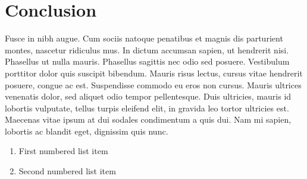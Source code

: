 \documentclass[a4paper, 12pt]{article} %
\begin{document}

\section*{Conclusion}

Fusce in nibh augue. Cum sociis natoque penatibus et magnis dis parturient montes, nascetur ridiculus mus. In dictum accumsan sapien, ut hendrerit nisi. Phasellus ut nulla mauris. Phasellus sagittis nec odio sed posuere. Vestibulum porttitor dolor quis suscipit bibendum. Mauris risus lectus, cursus vitae hendrerit posuere, congue ac est. Suspendisse commodo eu eros non cursus. Mauris ultrices venenatis dolor, sed aliquet odio tempor pellentesque. Duis ultricies, mauris id lobortis vulputate, tellus turpis eleifend elit, in gravida leo tortor ultricies est. Maecenas vitae ipsum at dui sodales condimentum a quis dui. Nam mi sapien, lobortis ac blandit eget, dignissim quis nunc.

\begin{enumerate}
\item First numbered list item
\item Second numbered list item
\end{enumerate}



%
%
%
%

\end{document}

